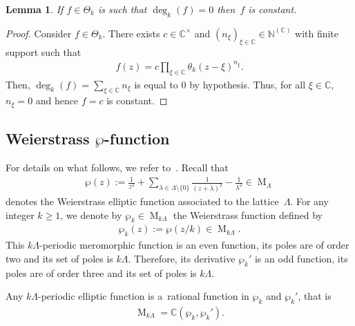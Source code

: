 \documentclass[10pt,a4paper]{amsart}
\numberwithin{equation}{section}
\newtheorem{Lemma}[Theorem]{Lemma}
\newcommand{\degr}[1]{\deg_{#1}}
\newcommand{\wpf}[1]{\wp_{#1}}
\newcommand{\prodtheta}[1]{\Theta_{#1}}
\begin{document}
\begin{Lemma}
If $f \in \prodtheta{k}$ is such that $\degr{k} (f)=0$ then~$f$ is constant.
\end{Lemma}

\begin{proof}
Consider $f \in \prodtheta{k}$.
There exists $c \in \mathbb C^{\times}$ and $(n_{\xi})_{\xi \in \mathbb C}\in \mathbb N^{(\mathbb C)}$ with f\/inite
support such that
\begin{gather*}
f(z)=c  \prod\limits_{\xi \in \mathbb C} \theta_{k}(z-\xi)^{n_{\xi}}.
\end{gather*}
Then, $\degr{k} (f)=\sum\limits_{\xi \in \mathbb C} n_{\xi}$ is equal to $0$ by hypothesis.
Thus, for all $\xi \in \mathbb C$, $n_{\xi}=0$ and hence $f=c$ is constant.
\end{proof}

\subsection[Weierstrass $\wp$-function]{Weierstrass $\boldsymbol{\wp}$-function}

For details on what follows, we refer to~\cite[Chapter~VI]{Silv}.
Recall that
\begin{gather*}
\wp(z):=\frac{1}{z^{2}}+ \sum\limits_{\lambda \in \Lambda \setminus \{0\}} \frac{1}{(z+\lambda)^{2}}
-\frac{1}{\lambda^{2}}\in \operatorname{M}_{\Lambda}
\end{gather*}
denotes the Weierstrass elliptic function associated to the lattice~$\Lambda$.
For any integer $k \geq 1$, we denote by $\wpf{k} \in \operatorname{M}_{k \Lambda}$ the Weierstrass function def\/ined by
\begin{gather*}
\wpf{k}(z):=\wp(z/k)\in \operatorname{M}_{k\Lambda}.
\end{gather*}
This $k\Lambda$-periodic meromorphic function is an even function, its poles are of order two and its set of poles is
$k\Lambda$.
Therefore, its derivative $\wpf{k}'$ is an odd function, its poles are of order three and its set of poles is
$k\Lambda$.

Any $k\Lambda$-periodic elliptic function is a~rational function in $\wpf{k}$ and $\wpf{k}'$, that is
\begin{gather*}
\operatorname{M}_{k\Lambda}=\mathbb C(\wpf{k},\wpf{k}').
\end{gather*}
\end{document}
